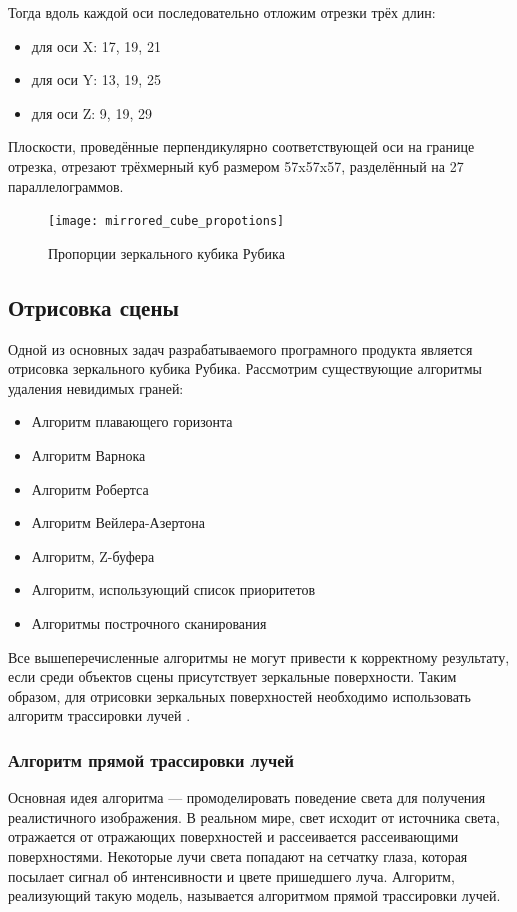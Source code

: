 Тогда вдоль каждой оси последовательно отложим отрезки трёх длин:
\begin{itemize}
	\item для оси X: 17, 19, 21
	\item для оси Y: 13, 19, 25
	\item для оси Z: 9, 19, 29
\end{itemize}

Плоскости, проведённые перпендикулярно соответствующей оси на границе отрезка, отрезают трёхмерный куб размером 57x57x57, разделённый на 27 параллелограммов. 

\begin{figure}[ht]
	\centering
	\texttt{[image: mirrored\_cube\_propotions]}
	\caption{Пропорции зеркального кубика Рубика}
	\label{fig:mirrored_cube_proportions}
\end{figure}

\subsection{Отрисовка сцены}
Одной из основных задач разрабатываемого програмного продукта является отрисовка зеркального кубика Рубика. Рассмотрим существующие алгоритмы удаления невидимых граней:
\begin{itemize}
	\item Алгоритм плавающего горизонта
	\item Алгоритм Варнока
	\item Алгоритм Робертса
	\item Алгоритм Вейлера-Азертона
	\item Алгоритм, Z-буфера
	\item Алгоритм, использующий список приоритетов
	\item Алгоритмы построчного сканирования
\end{itemize}

Все вышеперечисленные алгоритмы не могут привести к корректному результату, если среди объектов сцены присутствует зеркальные поверхности. Таким образом, для отрисовки зеркальных поверхностей необходимо использовать алгоритм трассировки лучей \cite{bib:computergraphics}.

\subsubsection{Алгоритм прямой трассировки лучей}
Основная идея алгоритма --- промоделировать поведение света для получения реалистичного изображения. В реальном мире, свет исходит от источника света, отражается от отражающих поверхностей и рассеивается рассеивающими поверхностями. Некоторые лучи света попадают на сетчатку глаза, которая посылает сигнал об интенсивности и цвете пришедшего луча. Алгоритм, реализующий такую модель, называется алгоритмом прямой трассировки лучей.

